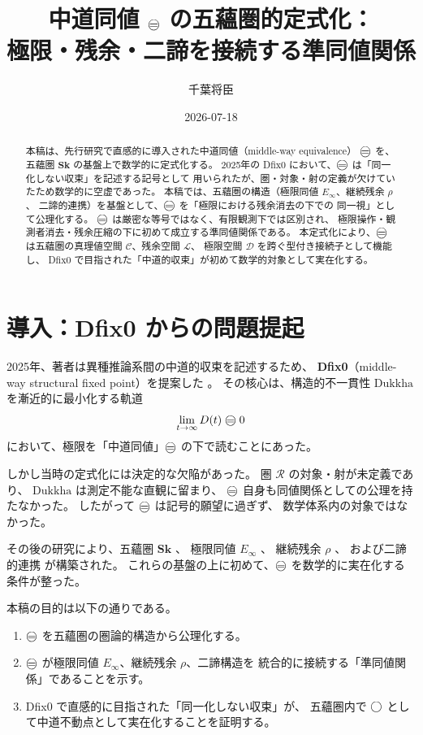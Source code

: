 \documentclass[11pt,a4paper]{article}
\title{中道同値 $\mweq$ の五蘊圏的定式化：\\
       極限・残余・二諦を接続する準同値関係}
\author{千葉将臣}
\date{2026-07-18}
\theoremstyle{definition}
\newcommand{\Sk}{\mathbf{Sk}}
\newcommand{\C}{\mathcal{C}}
\newcommand{\Lspace}{\mathcal{L}}
\newcommand{\Dspace}{\mathcal{D}}
\begin{document}
\maketitle

\begin{abstract}
本稿は、先行研究で直感的に導入された中道同値（middle-way equivalence）
$\mweq$ を、五蘊圏 $\Sk$ の基盤上で数学的に定式化する。
2025年の Dfix0 において、$\mweq$ は「同一化しない収束」を記述する記号として
用いられたが、圏・対象・射の定義が欠けていたため数学的に空虚であった。
本稿では、五蘊圏の構造（極限同値 $E_\infty$、継続残余 $\rho$、
二諦的連携）を基盤として、$\mweq$ を「極限における残余消去の下での
同一視」として公理化する。
$\mweq$ は厳密な等号ではなく、有限観測下では区別され、
極限操作・観測者消去・残余圧縮の下に初めて成立する準同値関係である。
本定式化により、$\mweq$ は五蘊圏の真理値空間 $\C$、残余空間 $\Lspace$、
極限空間 $\Dspace$ を跨ぐ型付き接続子として機能し、
Dfix0 で目指された「中道的収束」が初めて数学的対象として実在化する。
\end{abstract}

\section{導入：Dfix0 からの問題提起}

2025年、著者は異種推論系間の中道的収束を記述するため、
\textbf{Dfix0}（middle-way structural fixed point）を提案した
\cite{Chiba2025dfix0}。
その核心は、構造的不一貫性 $\mathrm{Dukkha}$ を漸近的に最小化する軌道
\[
\lim_{t\to\infty} D(t) \mweq 0
\]
において、極限を「中道同値」$\mweq$ の下で読むことにあった。

しかし当時の定式化には決定的な欠陥があった。
圏 $\mathcal{R}$ の対象・射が未定義であり、
$\mathrm{Dukkha}$ は測定不能な直観に留まり、
$\mweq$ 自身も同値関係としての公理を持たなかった。
したがって $\mweq$ は記号的願望に過ぎず、
数学体系内の対象ではなかった。

その後の研究により、五蘊圏 $\Sk$ \cite{Chiba2026skandha}、
極限同値 $E_\infty$ \cite{Chiba2026einfty}、
継続残余 $\rho$ \cite{Chiba2026continuation}、
および二諦的連携 \cite{Chiba2026twotruths} が構築された。
これらの基盤の上に初めて、$\mweq$ を数学的に実在化する条件が整った。

本稿の目的は以下の通りである。
\begin{enumerate}[label=(\arabic*)]
  \item $\mweq$ を五蘊圏の圏論的構造から公理化する。
  \item $\mweq$ が極限同値 $E_\infty$、継続残余 $\rho$、二諦構造を
    統合的に接続する「準同値関係」であることを示す。
  \item Dfix0 で直感的に目指された「同一化しない収束」が、
    五蘊圏内で $\bigcirc$ として中道不動点として実在化することを証明する。
\end{enumerate}
\end{document}
